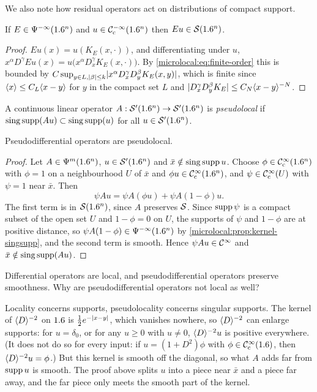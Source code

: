 We also note how residual operators act on distributions of compact
support.

\begin{lemma}\label{microlocal:lem:residual-compact}
  If $E\in\Psi^{-\infty}(1.6^n)$ and $u\in\mathcal{C}^{-\infty}_{\mathrm{c}}(1.6^n)$ then $Eu\in\mathcal{S}(1.6^n)$.
\end{lemma}
\begin{proof}
  $Eu(x)=u(K_E(x,\cdot))$, and differentiating under $u$,
  $x^\alpha D^\gamma Eu(x)=u\bigl(x^\alpha D^\gamma_xK_E(x,\cdot)\bigr)$. By
  \eqref{microlocal:eq:finite-order} this is bounded by
  $C\sup_{y\in L,\lvert \beta\rvert\le k}\lvert x^\alpha D^\gamma_xD^\beta_yK_E(x,y)\rvert$,
  which is finite since $\langle x\rangle\le C_L\langle x-y\rangle$ for $y$ in the compact set
  $L$ and $\lvert D^\gamma_xD^\beta_yK_E\rvert\le C_N\langle x-y\rangle^{-N}$.
\end{proof}

\begin{definition}
  A continuous linear operator $A:\mathcal{S}'(1.6^n)\to\mathcal{S}'(1.6^n)$ is
  \emph{pseudolocal} if $\operatorname{sing\,supp}(Au)\subset\operatorname{sing\,supp}(u)$ for all
  $u\in\mathcal{S}'(1.6^n)$.
\end{definition}

\begin{proposition}\label{microlocal:prop:pseudolocal}
  Pseudodifferential operators are pseudolocal.
\end{proposition}
\begin{proof}
  Let $A\in\Psi^{m}(1.6^n)$, $u\in\mathcal{S}'(1.6^n)$ and $\bar x\notin\operatorname{sing\,supp} u$.
  Choose $\phi\in\mathcal{C}^\infty_{\mathrm{c}}(1.6^n)$ with $\phi=1$ on a neighbourhood $U$ of $\bar x$
  and $\phi u\in\mathcal{C}^\infty_{\mathrm{c}}(1.6^n)$, and $\psi\in\mathcal{C}^\infty_{\mathrm{c}}(U)$ with $\psi=1$ near $\bar x$.
  Then
  \begin{equation*}
    \psi Au=\psi A(\phi u)+\psi A(1-\phi)u.
  \end{equation*}
  The first term is in $\mathcal{S}(1.6^n)$, since $A$ preserves $\mathcal{S}$. Since
  $\operatorname{supp}\psi$ is a compact subset of the open set $U$ and $1-\phi=0$ on $U$,
  the supports of $\psi$ and $1-\phi$ are at positive distance, so
  $\psi A(1-\phi)\in\Psi^{-\infty}(1.6^n)$ by
  \cref{microlocal:prop:kernel-singsupp}, and the second term is smooth.
  Hence $\psi Au\in\mathcal{C}^\infty$ and $\bar x\notin\operatorname{sing\,supp}(Au)$.
\end{proof}

\begin{question}
  Differential operators are local, and pseudodifferential operators preserve
  smoothness. Why are pseudodifferential operators not local as well?
\end{question}
\begin{answer}
  Locality concerns supports, pseudolocality concerns singular supports. The
  kernel of $\langle D\rangle^{-2}$ on $1.6$ is $\frac12e^{-\lvert x-y\rvert}$, which vanishes
  nowhere, so $\langle D\rangle^{-2}$ can enlarge supports: for $u=\delta_0$, or for any
$u\ge0$ with $u\ne0$, $\langle D\rangle^{-2}u$ is positive everywhere. (It does not do
so for every input: if $u=(1+D^2)\phi$ with $\phi\in\mathcal{C}^\infty_{\mathrm{c}}(1.6)$, then
$\langle D\rangle^{-2}u=\phi$.) But this kernel is
  smooth off the diagonal, so what $A$ adds far from $\operatorname{supp} u$ is smooth. The
  proof above splits $u$ into a piece near $\bar x$ and a piece far away, and
  the far piece only meets the smooth part of the kernel.
\end{answer}


